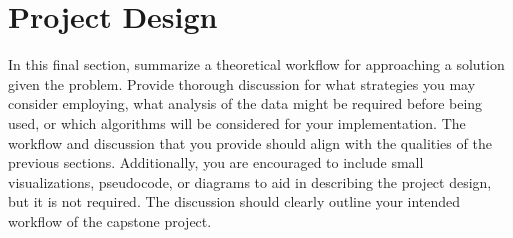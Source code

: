 \documentclass[10pt, a4paper, twocolumn]{article} %
\begin{document}
\section{Project Design} %

In this final section, summarize a theoretical workflow for approaching a solution given the problem. Provide thorough discussion for what strategies you may consider employing, what analysis of the data might be required before being used, or which algorithms will be considered for your implementation. The workflow and discussion that you provide should align with the qualities of the previous sections. Additionally, you are encouraged to include small visualizations, pseudocode, or diagrams to aid in describing the project design, but it is not required. The discussion should clearly outline your intended workflow of the capstone project.


\printbibliography[title={Bibliography}] %

\end{document}
